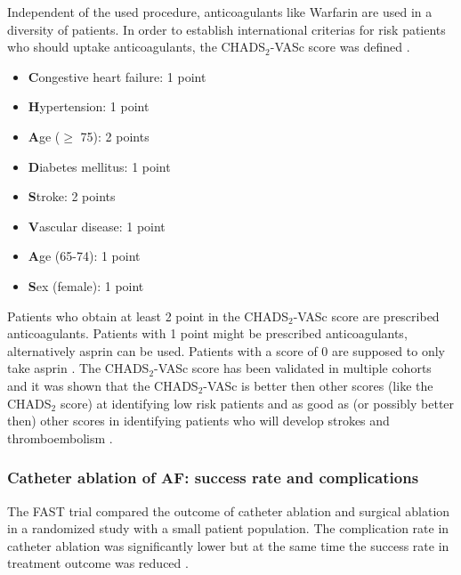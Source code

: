 \documentclass[type=dr, dr=rernat, accentcolor=tud7b,colorbacktitle, bigchapter, openright, twoside, 12pt ]{tudthesis}
\begin{document}



Independent of the used procedure, anticoagulants like Warfarin are used in a diversity of patients. In order to establish international 
criterias for risk patients who should uptake anticoagulants, the CHADS$_{2}$-VASc score was defined \cite{ESC12}.

\begin{itemize}
 \item [] \textbf{C}ongestive heart failure: 1 point
 \item [] \textbf{H}ypertension: 1 point
 \item [] \textbf{A}ge ($\geq$ 75): 2 points
 \item [] \textbf{D}iabetes mellitus: 1 point
 \item [] \textbf{S}troke: 2 points
 \item [] \textbf{V}ascular disease: 1 point
 \item [] \textbf{A}ge (65-74): 1 point
 \item [] \textbf{S}ex (female): 1 point
\end{itemize}

Patients who obtain at least 2 point in the CHADS$_{2}$-VASc score are prescribed anticoagulants. Patients with 1 point might be prescribed 
anticoagulants, alternatively asprin can be used. Patients with a score of 0 are supposed to only take asprin \cite{Fle}. The 
CHADS$_{2}$-VASc score has been validated in multiple cohorts \cite{Lip11} and it was shown that the CHADS$_{2}$-VASc is better then other 
scores (like the CHADS$_{2}$ score) at identifying low risk patients \cite{Pot12} \cite{Ole12} \cite{Van11} and as good as (or possibly 
better then) other scores in identifying patients who will develop strokes and thromboembolism \cite{Fri12} \cite{Ole11} \cite{Bor11}. 



\subsubsection*{Catheter ablation of AF: success rate and complications}

The FAST trial compared the outcome of catheter ablation and surgical ablation in a randomized study with a small patient population. 
The complication rate in catheter ablation was significantly lower but at the same time the success rate in treatment outcome was 
reduced \cite{Boe12}. \newline
\end{document}
